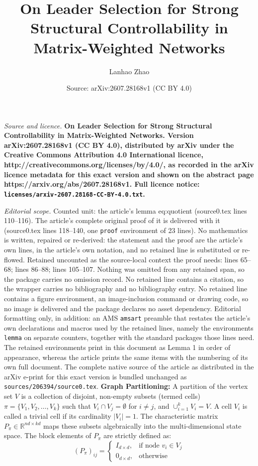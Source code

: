 \documentclass[10pt,a4paper]{amsart}
\title{\LARGE \bf On Leader Selection for Strong Structural Controllability in Matrix-Weighted Networks}
\author{Lanhao Zhao}
\date{Source: arXiv:2607.28168v1 (CC BY 4.0)}
\begin{document}
\maketitle

\noindent\emph{Source and licence.} \LARGE \bf On Leader Selection for Strong Structural Controllability in Matrix-Weighted Networks. Version arXiv:2607.28168v1 (CC BY 4.0), distributed by arXiv under the Creative Commons Attribution 4.0 International licence, http://creativecommons.org/licenses/by/4.0/, as recorded in the arXiv licence metadata for this exact version and shown on the abstract page https://arxiv.org/abs/2607.28168v1. Full licence notice: \texttt{licenses/arxiv-2607.28168-CC-BY-4.0.txt}.\par\smallskip

\noindent\textit{Editorial scope.} Counted unit: the article's lemma eq:quotient (source0.tex lines 110--116). The article's complete original proof of it is delivered with it (source0.tex lines 118--140, one \texttt{proof} environment of 23 lines). No mathematics is written, repaired or re-derived: the statement and the proof are the article's own lines, in the article's own notation, and no retained line is substituted or re-flowed.  Retained uncounted as the source-local context the proof needs: lines 65--68; lines 86--88; lines 105--107.  Nothing was omitted from any retained span, so the package carries no omission record.  No retained line contains a citation, so the wrapper carries no bibliography and no bibliography entry.  No retained line contains a figure environment, an image-inclusion command or drawing code, so no image is delivered and the package declares no asset dependency.  Editorial formatting only, in addition: an AMS \texttt{amsart} preamble that restates the article's own declarations and macros used by the retained lines, namely the environments \texttt{lemma} on separate counters, together with the standard packages those lines need.  The retained environments print in this document as Lemma 1 in order of appearance, whereas the article prints the same items with the numbering of its own full document.  The complete native source of the article as distributed in the arXiv e-print for this exact version is bundled unchanged as \texttt{sources/206394/source0.tex}.
	\textbf{Graph Partitioning:} A partition of the vertex set $V$ is a collection of disjoint, non-empty subsets (termed cells) $\pi=\{V_{1},V_{2},\dots,V_{k}\}$ such that $V_i \cap V_j = \emptyset$ for $i \neq j$, and $\cup_{i=1}^k V_{i}=V$. A cell $V_i$ is called a trivial cell if its cardinality $|V_i|=1$. The characteristic matrix $P_{\pi} \in \mathbb{R}^{nd \times kd}$ maps these subsets algebraically into the multi-dimensional state space. The block elements of $P_{\pi}$ are strictly defined as:
	\begin{equation}
		(P_{\pi})_{ij} = \begin{cases} I_{d \times d}, & \text{if node } v_i \in V_j \\ 0_{d \times d}, & \text{otherwise} \end{cases} \label{eq:P_pi}
	\end{equation}
\end{document}
